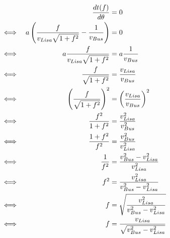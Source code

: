 \documentclass[10pt]{article}
\begin{document}
\begin{align*}
&&\frac{dt(f)}{d\theta} &= 0\\
\iff&&a\left(\frac{f}{v_{Lisa}\sqrt{1+f^2}} - \frac{1}{v_{Bus}}\right) &= 0\\
\iff&&a\frac{f}{v_{Lisa}\sqrt{1+f^2}} &= a\frac{1}{v_{Bus}}\\
\iff&&\frac{f}{\sqrt{1+f^2}} &= \frac{v_{Lisa}}{v_{Bus}}\\
\iff&&\left(\frac{f}{\sqrt{1+f^2}}\right)^2 &= \left(\frac{v_{Lisa}}{v_{Bus}}\right)^2\\
\iff&&\frac{f^2}{1+f^2} &= \frac{v_{Lisa}^2}{v_{Bus}^2}\\
\iff&&\frac{1+f^2}{f^2} &= \frac{v_{Bus}^2}{v_{Lisa}^2}\\
\iff&&\frac{1}{f^2} &= \frac{v_{Bus}^2-v_{Lisa}^2}{v_{Lisa}^2}\\
\iff&&f^2 &= \frac{v_{Lisa}^2}{v_{Bus}^2-v_{Lisa}^2}\\
\iff&&f &= \sqrt{\frac{v_{Lisa}^2}{v_{Bus}^2-v_{Lisa}^2}}\\
\iff&&f &= \frac{v_{Lisa}}{\sqrt{v_{Bus}^2-v_{Lisa}^2}}\\
\end{align*}
\end{document}

